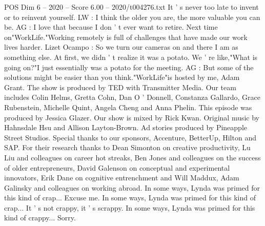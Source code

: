 \begin{textsample}{POS Dim 6 – 2020 – Score 6.00 – 2020/t004276.txt}
It ' s never too late to invent or to reinvent yourself.
LW : I think the older you are, the more valuable you can be.
AG : I love that because I don ' t ever want to retire.
Next time on"WorkLife."Working remotely is full of challenges that have made our work lives harder.
Lizet Ocampo : So we turn our cameras on and there I am as something else.
At first, we didn ' t realize it was a potato.
We ' re like,"What is going on?"I just essentially was a potato for the meeting.
AG : But some of the solutions might be easier than you think."WorkLife"is hosted by me, Adam Grant.
The show is produced by TED with Transmitter Media.
Our team includes Colin Helms, Gretta Cohn, Dan O ' Donnell, Constanza Gallardo, Grace Rubenstein, Michelle Quint, Angela Cheng and Anna Phelin.
This episode was produced by Jessica Glazer.
Our show is mixed by Rick Kwan.
Original music by Hahnsdale Hsu and Allison Layton-Brown.
Ad stories produced by Pineapple Street Studios.
Special thanks to our sponsors, Accenture, BetterUp, Hilton and SAP.
For their research thanks to Dean Simonton on creative productivity, Lu Liu and colleagues on career hot streaks, Ben Jones and colleagues on the success of older entrepreneurs, David Galenson on conceptual and experimental innovators, Erik Dane on cognitive entrenchment and Will Maddux, Adam Galinsky and colleagues on working abroad.
In some ways, Lynda was primed for this kind of crap...
Excuse me.
In some ways, Lynda was primed for this kind of crap...
It ' s not crappy, it ' s scrappy.
In some ways, Lynda was primed for this kind of crappy...
Sorry.

\end{textsample}
